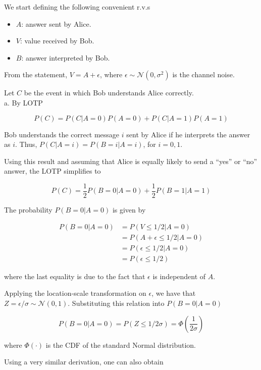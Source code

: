 We start defining the following convenient r.v.s

\begin{itemize}
\item $A$: answer sent by Alice.

\item $V$: value received by Bob.

\item $B$: answer interpreted by Bob.
\end{itemize}

From the statement, $V = A + \epsilon$, where $\epsilon \sim \mathcal{N}(0,\sigma^2)$ is the channel noise.

Let $C$ be the event in which Bob understands Alice correctly.\\

a. By LOTP

$$
P(C) = P(C|A=0) P(A=0) + P(C|A=1) P(A=1)
$$

Bob understands the correct message $i$ sent by Alice if he interprets the answer as $i$. Thus, $P(C|A=i) = P(B=i|A=i)$, for $i=0,1$.

Using this result and assuming that Alice is equally likely to send a ``yes'' or ``no'' answer, the LOTP simplifies to

$$
P(C) = \frac{1}{2} P(B=0|A=0) + \frac{1}{2} P(B=1|A=1)
$$

The probability $P(B=0|A=0)$ is given by

\begin{equation*}
\begin{split}
P(B=0|A=0)
&= P(V \le 1/2 | A=0) \\
&= P(A + \epsilon \le 1/2 | A=0) \\
&= P(\epsilon \le 1/2 | A=0) \\
&= P(\epsilon \le 1/2)
\end{split}
\end{equation*}

\noindent where the last equality is due to the fact that $\epsilon$ is independent of $A$.

Applying the location-scale transformation on $\epsilon$, we have that $Z = \epsilon/\sigma \sim \mathcal{N}(0,1)$.
Substituting this relation into $P(B=0|A=0)$

$$
P(B=0 | A=0) = P(Z \le 1/2\sigma) = \Phi \left( \frac{1}{2\sigma} \right)
$$

\noindent where $\Phi(\cdot)$ is the CDF of the standard Normal distribution.

Using a very similar derivation, one can also obtain

